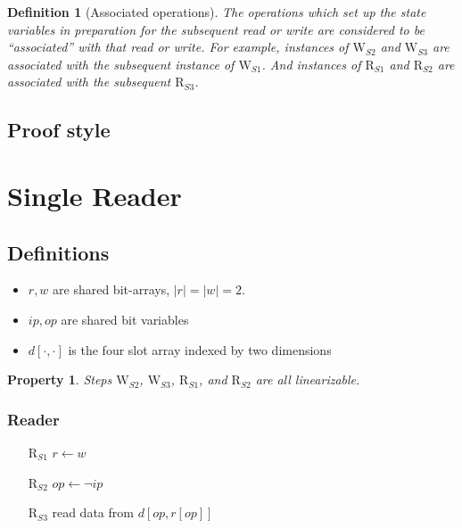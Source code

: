 \documentclass{article}
\newtheorem{defn}{Definition}
\newtheorem{prop}{Property}
\newcommand\len[1]{\left|#1\right|}
\newcommand\RS[1]{\ensuremath{\text{R}_{S#1}}}
\newcommand\WS[1]{\ensuremath{\text{W}_{S#1}}}
\newcommand\R[1]{\ensuremath{r\left[#1\right]}}
\newcommand\data[1]{\ensuremath{d\left[#1\right]}}
\newcommand\ip{\ensuremath{ip}}
\newcommand\op{\ensuremath{op}}
\begin{document}
\begin{defn}[Associated operations]
  The operations which set up the state variables in preparation for
  the subsequent read or write are considered to be ``associated''
  with that read or write. For example, instances of \WS2 and \WS3 are
  associated with the subsequent instance of \WS1. And instances of
  \RS1 and \RS2 are associated with the subsequent \RS3.
\end{defn}

\subsection{Proof style}



\section{Single Reader}
\subsection{Definitions}

\begin{itemize}
  \item $r,w$ are shared bit-arrays, $\len r=\len w=2$.
  \item $\ip,\op$ are shared bit variables
  \item $\data{\cdot,\cdot}$ is the four slot array indexed by two dimensions
\end{itemize}

\begin{prop}\label{prop:linearizable}
  Steps \WS2, \WS3, \RS1, and \RS2 are all linearizable.
\end{prop}

\subsubsection{Reader}
\begin{itemize}
\item[\RS 1] $r\gets w$
\item[\RS 2] $\op\gets\neg\ip$
\item[\RS 3] read data from $\data{\op,\R{\op}}$
\end{itemize}
\end{document}
